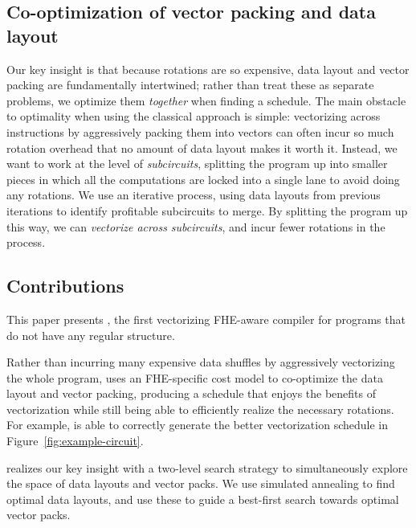 \subsection*{Co-optimization of vector packing and data layout}
Our key insight is that because rotations are so expensive, data layout and vector packing are fundamentally intertwined; rather than treat these as separate problems, we optimize them {\em together} when finding a schedule.
The main obstacle to optimality when using the classical approach is simple: vectorizing across instructions by aggressively packing them into vectors can often incur so much rotation overhead that no amount of data layout makes it worth it.
Instead, we want to work at the level of {\em subcircuits}, splitting the program up into smaller pieces in which all the computations are locked into a single lane to avoid doing any rotations.
We use an iterative process, using data layouts from previous iterations to identify profitable subcircuits to merge.
By splitting the program up this way, we can {\em vectorize across subcircuits}, and incur fewer rotations in the process.

\subsection*{Contributions}
This paper presents \system, the first vectorizing FHE-aware compiler for programs that do not have any regular structure. 

Rather than incurring many expensive data shuffles by aggressively vectorizing the whole program, \system uses an FHE-specific cost model to co-optimize the data layout and vector packing, producing a schedule that enjoys the benefits of vectorization while still being able to efficiently realize the necessary rotations. For example, \system is able to correctly generate the better vectorization schedule in Figure~\ref{fig:example-circuit}.

\system realizes our key insight with a two-level search strategy to simultaneously explore the space of data layouts and vector packs.
We use simulated annealing to find optimal data layouts, and use these to guide a best-first search towards optimal vector packs. 

